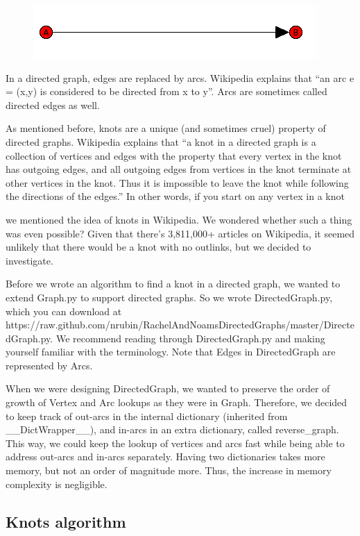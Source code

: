 \documentclass[10pt]{book}
\begin{document}
\begin{figure}[here]
 \centering
\includegraphics[scale=0.6]{../Images/DirectedGraphExample.png}
\end{figure}
In a directed graph, edges are replaced by arcs. Wikipedia explains that “an arc e = (x,y) is considered to be directed from x to y”. Arcs are sometimes called directed edges as well. 

As mentioned before, knots are a unique (and sometimes cruel) property of directed graphs. Wikipedia explains that “a knot in a directed graph is a collection of vertices and edges with the property that every vertex in the knot has outgoing edges, and all outgoing edges from vertices in the knot terminate at other vertices in the knot. Thus it is impossible to leave the knot while following the directions of the edges.” In other words, if you start on any vertex in a knot

we mentioned the idea of knots in Wikipedia. We wondered whether such a thing was even possible? Given that there’s 3,811,000+ articles on Wikipedia, it seemed unlikely that there would be a knot with no outlinks, but we decided to investigate.

Before we wrote an algorithm to find a knot in a directed graph, we wanted to extend Graph.py to support directed graphs. So we wrote DirectedGraph.py, which you can download at https://raw.github.com/nrubin/RachelAndNoamsDirectedGraphs/master/DirectedGraph.py. We recommend reading through DirectedGraph.py and making yourself familiar with the terminology. Note that Edges in DirectedGraph are represented by Arcs.

When we were designing DirectedGraph, we wanted to preserve the order of growth of Vertex and Arc lookups as they were in Graph. Therefore, we decided to keep track of out-arcs in the internal dictionary (inherited from \_\_DictWrapper\_\_), and in-arcs in an extra dictionary, called reverse\_graph. This way, we could keep the lookup of vertices and arcs fast while being able to address out-arcs and in-arcs separately. Having two dictionaries takes more memory, but not an order of magnitude more. Thus, the increase in memory complexity is negligible.

\subsection{Knots algorithm}
\end{document}
